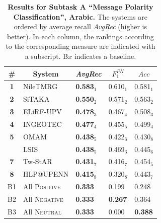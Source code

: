 \begin{table}[h!]
\centering
\begin{small}
\renewcommand{\arraystretch}{1.0}%
\begin{tabular}{|c|l|l|l|l|}
\hline
      \bf \# & \multicolumn{1}{c|}{\bf System} & \multicolumn{1}{c|}{\it AvgRec} & \multicolumn{1}{c|}{$F_{1}^{PN}$} & \multicolumn{1}{c|}{$Acc$} \\
\hline
\bf 1 & NileTMRG & \bf 0.583$_{1}$ & 0.610$_{1}$ & 0.581$_{1}$ \\
\bf 2 & SiTAKA & \bf 0.550$_{2}$ & 0.571$_{2}$ & 0.563$_{2}$ \\
\bf 3 & ELiRF-UPV & \bf 0.478$_{3}$ & 0.467$_{4}$ & 0.508$_{3}$ \\
\bf 4 & INGEOTEC & \bf 0.477$_{4}$ & 0.455$_{5}$ & 0.499$_{4}$ \\
\bf 5 & OMAM & \bf 0.438$_{5}$ & 0.422$_{6}$ & 0.430$_{8}$ \\
& LSIS & \bf 0.438$_{5}$ & 0.469$_{3}$ & 0.445$_{6}$ \\
\bf 7 & Tw-StAR & \bf 0.431$_{7}$ & 0.416$_{7}$ & 0.454$_{5}$ \\
\bf 8 & HLP@UPENN & \bf 0.415$_{8}$ & 0.320$_{8}$ & 0.443$_{7}$ \\
\hline
B1 & All \textsc{Positive} & \bf 0.333 & 0.199 & 0.248\\
B2 & All \textsc{Negative} & \bf 0.333 & \bf 0.267 & 0.364\\
B3 & All \textsc{Neutral}  & \bf 0.333 & 0.000 & \bf 0.388\\
\hline
\end{tabular}
\caption{\textbf{Results for Subtask A ``Message Polarity Classification'', Arabic.} 
The systems are ordered by average recall \emph{AvgRec} (higher is better). In each column, the rankings according to the corresponding measure are indicated with a subscript. B$x$ indicates a baseline.}
\label{table:ResultsSubtaskA:Arabic}
\end{small}
\end{table}
